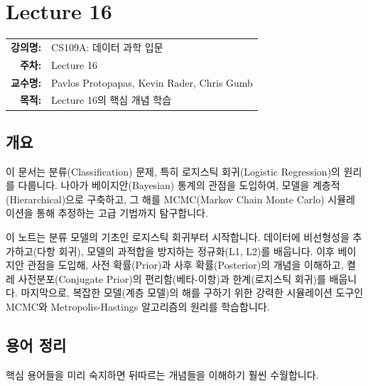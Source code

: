 \documentclass[11pt,a4paper]{book}
\makeatletter
\theoremstyle{definition}
\newcommand{\metainfo}[4]{
\begin{tcolorbox}[
    colback=lightpurple,
    colframe=darkpurple,
    boxrule=1pt,
    arc=2mm,
    left=10pt,
    right=10pt,
    top=8pt,
    bottom=8pt
]
\begin{tabular}{@{}rl@{}}
\textbf{강의명:} & #1 \\[0.3em]
\textbf{주차:} & #2 \\[0.3em]
\textbf{교수명:} & #3 \\[0.3em]
\textbf{목적:} & \begin{minipage}[t]{0.75\textwidth}#4\end{minipage}
\end{tabular}
\end{tcolorbox}
}
\makeatother
\begin{document}
\chapter{Lecture 16}
\label{ch:lecture16}

\metainfo{CS109A: 데이터 과학 입문}{Lecture 16}{Pavlos Protopapas, Kevin Rader, Chris Gumb}{Lecture 16의 핵심 개념 학습}


\section{개요}

이 문서는 분류(Classification) 문제, 특히 로지스틱 회귀(Logistic Regression)의 원리를 다룹니다.
나아가 베이지안(Bayesian) 통계의 관점을 도입하여, 모델을 계층적(Hierarchical)으로 구축하고,
그 해를 MCMC(Markov Chain Monte Carlo) 시뮬레이션을 통해 추정하는 고급 기법까지 탐구합니다.

\begin{summarybox}
이 노트는 분류 모델의 기초인 로지스틱 회귀부터 시작합니다.
데이터에 비선형성을 추가하고(다항 회귀), 모델의 과적합을 방지하는 정규화(L1, L2)를 배웁니다.
이후 베이지안 관점을 도입해, 사전 확률(Prior)과 사후 확률(Posterior)의 개념을 이해하고,
켤레 사전분포(Conjugate Prior)의 편리함(베타-이항)과 한계(로지스틱 회귀)를 배웁니다.
마지막으로, 복잡한 모델(계층 모델)의 해를 구하기 위한 강력한 시뮬레이션 도구인 MCMC와 Metropolis-Hastings 알고리즘의 원리를 학습합니다.
\end{summarybox}


\section{용어 정리}

핵심 용어들을 미리 숙지하면 뒤따르는 개념들을 이해하기 훨씬 수월합니다.
\end{document}
